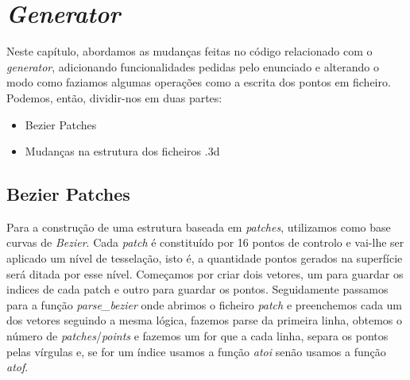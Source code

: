 \documentclass[14pt, a4 paper]{report}
\begin{document}
\chapter{\textit{Generator}} \label{chap:generator}
Neste capítulo, abordamos as mudanças feitas no código relacionado com o \textit{generator}, adicionando funcionalidades pedidas pelo enunciado e alterando o modo como faziamos algumas operações como a escrita dos pontos em ficheiro. Podemos, então, dividir-nos em duas partes:

\begin{itemize}
    \item Bezier Patches
    \item Mudanças na estrutura dos ficheiros .3d
\end{itemize}

\section{Bezier Patches}
Para a construção de uma estrutura baseada em \textit{patches}, utilizamos como base curvas de \textit{Bezier}. Cada \textit{patch} é constituído por 16 pontos de controlo e vai-lhe ser aplicado um nível de tesselação, isto é, a quantidade pontos gerados na superfície será ditada por esse nível.
Começamos por criar dois vetores, um para guardar os indices de cada patch e outro para guardar os pontos. Seguidamente passamos para a função \textit{parse\_bezier} onde abrimos o ficheiro \textit{patch} e preenchemos cada um dos vetores seguindo a mesma lógica, fazemos parse da primeira linha, obtemos o número de \textit{patches}/\textit{points} e fazemos um for que a cada linha, separa os pontos pelas vírgulas e, se for um índice usamos a função \textit{atoi} senão usamos a função \textit{atof}.
\end{document}
